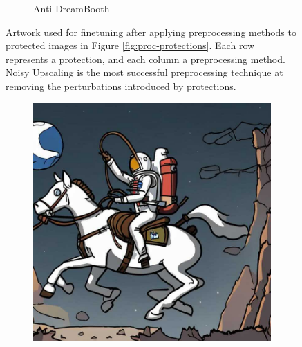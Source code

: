 \documentclass{article}
\begin{document}
\begin{figure}[h]
\begin{subfigure}[t]{\textwidth}
\begin{subfigure}[b]{0.24\textwidth}
     \end{subfigure}
    \caption{Anti-DreamBooth}
    \end{subfigure}
    \caption{Artwork used for finetuning after applying preprocessing methods to protected images in Figure \ref{fig:proc-protections}. Each row represents a protection, and each column a preprocessing method. Noisy Upscaling is the most successful preprocessing technique at removing the perturbations introduced by protections.}
    \label{fig:proc-preprocessing}
\end{figure}

\clearpage

\begin{figure}[h]
    \centering
        \begin{subfigure}[b]{0.24\textwidth}
         \centering
         \includegraphics[width=\textwidth]{plots/process/generations/clean/1.jpeg}
     \end{subfigure}
     \hfill
     \begin{subfigure}[b]{0.24\textwidth}
         \centering

\end{subfigure}
\end{figure}
\end{document}
